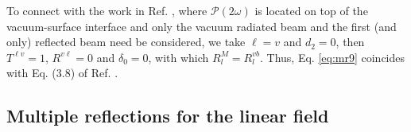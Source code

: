 To connect with the work in Ref. \cite{mizrahiJOSA88}, where
$\boldsymbol{\mathcal{P}}(2\omega)$ is located on top of the vacuum-surface
interface and only the vacuum radiated beam and the first (and only) reflected
beam need be considered, we take $\ell = v$ and $d_{2} = 0$, then $T^{\ell v} =
1$, $R^{v\ell} = 0$ and $\delta_{0} = 0$, with which $R^{M}_{l}=R^{vb}_{l}$.
Thus, Eq. \eqref{eq:mr9} coincides with Eq. (3.8) of Ref. \cite{mizrahiJOSA88}.



\subsection{Multiple reflections for the linear field}

